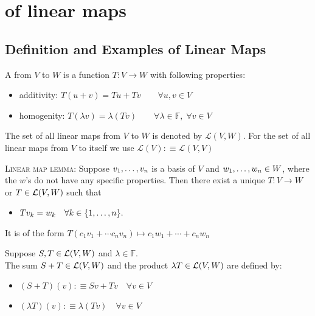 \section{\vs of linear maps}

\subsection{Definition and Examples of Linear Maps}

\begin{mydef}
  A \lm from $V$ to $W$ is a function $T:V\to W$ with following properties:
  \begin{itemize}
    \item additivity: $T(u+v)=Tu + Tv \qquad \forall u,v \in V$
    \item homogenity: $T(\lambda v)=\lambda (Tv) \qquad
    \forall \lambda \in \mathbb{F}, \; \forall v\in V$
  \end{itemize}
\end{mydef}

\begin{mydef}
  The set of all linear maps from $V$ to $W$ is denoted by $\mathcal{L}(V,W)$. For the set of all linear maps from $V$ to itself we use $\mathcal{L}(V) :\equiv \mathcal{L}(V,V)$
\end{mydef}

\setcounter{thm}{3}
\begin{thm}
  {\scshape Linear map lemma: }
  Suppose $v_1, \dots, v_n$ is a basis of $V$ and $w_1, \dots, w_n \in W$, where the $w$'s do not have any specific properties. Then there exist a unique \lm $T:V\to W$ or $T \in \mathcal{L}(V,W)$ such that
  \begin{itemize}
    \item[] $Tv_{k} = w_k \quad \forall k \in \{1, \dots, n \}.$
  \end{itemize}
  It is of the form $T(c_1 v_1 + \cdots c_n v_n) \mapsto c_1 w_1 + \cdots + c_n w_n$
\end{thm}

\setcounter{thm}{4}
\begin{mydef}
  Suppose $S, T \in {\mathcal{L}(V,W)}$ and $\lambda \in \mathbb{F}.$ \\
  The sum $S+T \in \mathcal{L} (V,W)$ and the product $\lambda T \in \mathcal{L} (V,W)$ are defined by:
  \begin{itemize}
    \item $(S+T)(v) :\equiv Sv+Tv \quad \forall v \in V$
    \item $(\lambda T)(v) : \equiv \lambda (Tv) \quad \forall v \in V$
  \end{itemize}
\end{mydef}

